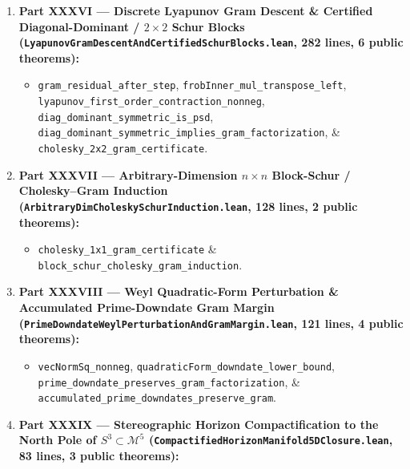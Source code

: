 \documentclass[
  11pt,
]{article}
\providecommand{\tightlist}{%
  \setlength{\itemsep}{0pt}\setlength{\parskip}{0pt}}
\begin{document}
\begin{enumerate}
  \begin{itemize}
  \tightlist
  \item
    \texttt{adelic\_gram\_sum\_is\_psd},
    \texttt{archimedean\_loewner\_dominance\_implies\_gram\_factorization},
    \texttt{frobNormSq\_nonneg},
    \texttt{gramLyapunovEnergy\_eq\_frobNormSq},
    \texttt{lyapunov\_gradient\_flow\_dissipation},
    \texttt{lyapunov\_invertible\_stationary\_implies\_exact\_gram}, \&
    \texttt{uniform\_adelic\_gram\_dominance\_implies\_all\_horizon\_gram}.
  \end{itemize}
\item
  \textbf{Part XXXVI --- Discrete Lyapunov Gram Descent \& Certified
  Diagonal-Dominant / \(2 \times 2\) Schur Blocks
  (\texttt{LyapunovGramDescentAndCertifiedSchurBlocks.lean}, 282 lines,
  6 public theorems):}

  \begin{itemize}
  \tightlist
  \item
    \texttt{gram\_residual\_after\_step},
    \texttt{frobInner\_mul\_transpose\_left},
    \texttt{lyapunov\_first\_order\_contraction\_nonneg},
    \texttt{diag\_dominant\_symmetric\_is\_psd},
    \texttt{diag\_dominant\_symmetric\_implies\_gram\_factorization}, \&
    \texttt{cholesky\_2x2\_gram\_certificate}.
  \end{itemize}
\item
  \textbf{Part XXXVII --- Arbitrary-Dimension \(n \times n\) Block-Schur
  / Cholesky--Gram Induction
  (\texttt{ArbitraryDimCholeskySchurInduction.lean}, 128 lines, 2 public
  theorems):}

  \begin{itemize}
  \tightlist
  \item
    \texttt{cholesky\_1x1\_gram\_certificate} \&
    \texttt{block\_schur\_cholesky\_gram\_induction}.
  \end{itemize}
\item
  \textbf{Part XXXVIII --- Weyl Quadratic-Form Perturbation \&
  Accumulated Prime-Downdate Gram Margin
  (\texttt{PrimeDowndateWeylPerturbationAndGramMargin.lean}, 121 lines,
  4 public theorems):}

  \begin{itemize}
  \tightlist
  \item
    \texttt{vecNormSq\_nonneg},
    \texttt{quadraticForm\_downdate\_lower\_bound},
    \texttt{prime\_downdate\_preserves\_gram\_factorization}, \&
    \texttt{accumulated\_prime\_downdates\_preserve\_gram}.
  \end{itemize}
\item
  \textbf{Part XXXIX --- Stereographic Horizon Compactification to the
  North Pole of \(S^3 \subset \mathcal{M}^5\)
  (\texttt{CompactifiedHorizonManifold5DClosure.lean}, 83 lines, 3
  public theorems):}


\end{enumerate}
\end{document}
